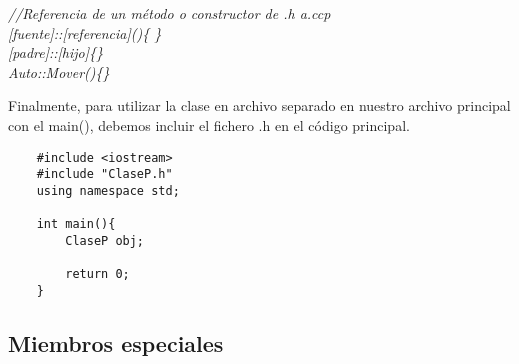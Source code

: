 \begin{center}
    \textit{//Referencia de un método o constructor de .h a.ccp}\\
    \textit{[fuente]::[referencia]()\{ \}}\\
    \textit{[padre]::[hijo]\{\}}\\
    \textit{Auto::Mover()\{\}}
\end{center}
Finalmente, para utilizar la clase en archivo separado en nuestro archivo principal con el main(), debemos incluir el fichero .h en el código principal.
\begin{lstlisting}
    #include <iostream>
    #include "ClaseP.h"
    using namespace std;
    
    int main(){
        ClaseP obj;
        
        return 0;
    }
\end{lstlisting}

\subsection{Miembros especiales}
